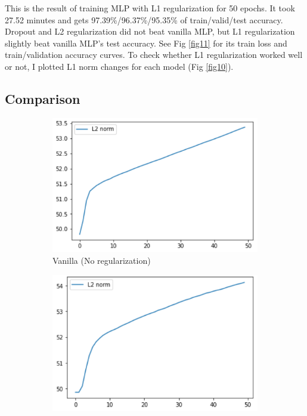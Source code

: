 \documentclass[11pt]{article}
\begin{document}
    This is the result of training MLP with L1 regularization for 50 epochs. It took 27.52 minutes and gets 97.39\%/96.37\%/95.35\% of train/valid/test accuracy. Dropout and L2 regularization did not beat vanilla MLP, but L1 regularization slightly beat vanilla MLP's test accuracy. See Fig \ref{fig11} for its train loss and train/validation accuracy curves. To check whether L1 regularization worked well or not, I plotted L1 norm changes for each model (Fig \ref{fig10}).

\subsection{Comparison}\label{regularization}
    \begin{figure}[H]
        \begin{subfigure}[H]{0.5\textwidth}
            \includegraphics[width=1\linewidth]{img/MLP/l2.PNG}
            \caption{Vanilla (No regularization)}\vspace{2mm}
        \end{subfigure}
        \begin{subfigure}[H]{0.5\textwidth}
            \includegraphics[width=1\linewidth]{img/Dropout/l2.PNG}

\end{subfigure}
\end{figure}
\end{document}
